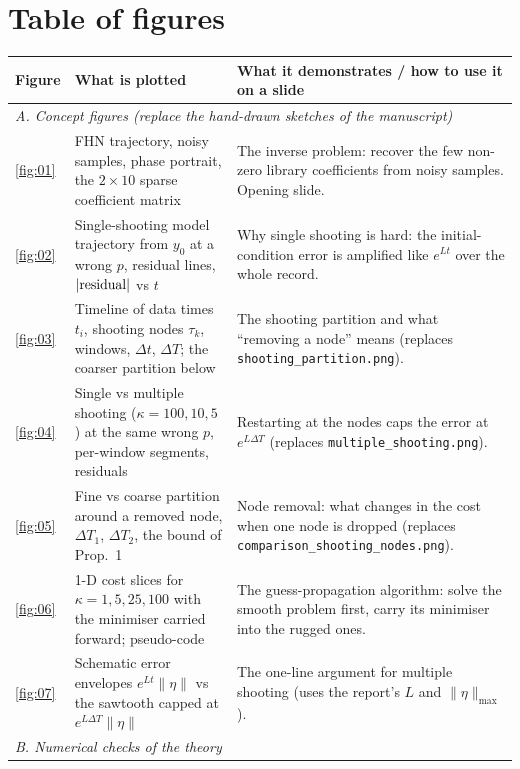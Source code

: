 \documentclass[10pt]{article}
\begin{document}
\section*{Table of figures}
\small
\begin{longtable}{p{} p{} p{}}
\toprule
Figure & What is plotted & What it demonstrates / how to use it on a slide \\
\midrule
\endhead
\multicolumn{3}{l}{\emph{A. Concept figures (replace the hand-drawn sketches of the manuscript)}}\\
\ref{fig:01} & FHN trajectory, noisy samples, phase portrait, the $2\times10$ sparse coefficient matrix & The inverse problem: recover the few non-zero library coefficients from noisy samples. Opening slide.\\
\ref{fig:02} & Single-shooting model trajectory from $y_0$ at a wrong $p$, residual lines, $|{\rm residual}|$ vs $t$ & Why single shooting is hard: the initial-condition error is amplified like $e^{Lt}$ over the whole record.\\
\ref{fig:03} & Timeline of data times $t_i$, shooting nodes $\tau_k$, windows, $\Delta t$, $\Delta T$; the coarser partition below & The shooting partition and what ``removing a node'' means (replaces \texttt{shooting\_partition.png}).\\
\ref{fig:04} & Single vs multiple shooting ($\kappa=100,10,5$) at the same wrong $p$, per-window segments, residuals & Restarting at the nodes caps the error at $e^{L\Delta T}$ (replaces \texttt{multiple\_shooting.png}).\\
\ref{fig:05} & Fine vs coarse partition around a removed node, $\Delta T_1$, $\Delta T_2$, the bound of Prop.~1 & Node removal: what changes in the cost when one node is dropped (replaces \texttt{comparison\_shooting\_nodes.png}).\\
\ref{fig:06} & 1-D cost slices for $\kappa=1,5,25,100$ with the minimiser carried forward; pseudo-code & The guess-propagation algorithm: solve the smooth problem first, carry its minimiser into the rugged ones.\\
\ref{fig:07} & Schematic error envelopes $e^{Lt}\lVert\eta\rVert$ vs the sawtooth capped at $e^{L\Delta T}\lVert\eta\rVert$ & The one-line argument for multiple shooting (uses the report's $L$ and $\lVert\eta\rVert_{\max}$).\\
\midrule
\multicolumn{3}{l}{\emph{B. Numerical checks of the theory}}\\

\end{longtable}
\end{document}
